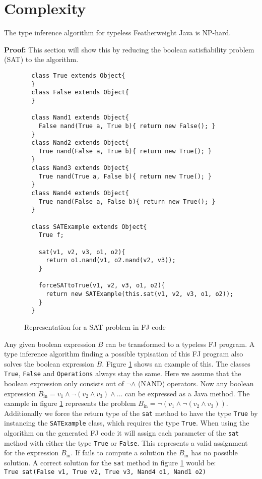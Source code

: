 \section{Complexity}
\label{sec:complexity}

\begin{theorem}[NP-Hardness]
  \label{theo:np-hardness}
  The type inference algorithm for typeless Featherweight Java is NP-hard.
\end{theorem}

\textbf{Proof:} This section will show this by reducing the boolean satisfiability problem (SAT) to the \fjtypeinference{} algorithm.

\begin{figure}
\begin{lstlisting}
  class True extends Object{
  }
  class False extends Object{
  }

  class Nand1 extends Object{
    False nand(True a, True b){ return new False(); }
  }
  class Nand2 extends Object{
    True nand(False a, True b){ return new True(); }
  }
  class Nand3 extends Object{
    True nand(True a, False b){ return new True(); }
  }
  class Nand4 extends Object{
    True nand(False a, False b){ return new True(); }
  }

  class SATExample extends Object{
    True f;

    sat(v1, v2, v3, o1, o2){
      return o1.nand(v1, o2.nand(v2, v3));
    }

    forceSATtoTrue(v1, v2, v3, o1, o2){
      return new SATExample(this.sat(v1, v2, v3, o1, o2));
    }
  }
\end{lstlisting}

\caption{Representation for a SAT problem in FJ code}
\label{fig:fjSATcode}
\end{figure}

Any given boolean expression $B$ can be transformed to a typeless FJ program.
A type inference algorithm finding a possible typisation of this FJ program also solves the boolean expression $B$.
Figure \ref{fig:fjSATcode} shows an example of this.
The classes \texttt{True}, \texttt{False} and \texttt{Operations} always stay the same.
Here we assume that the boolean expression only consists out of $\neg \land$ (NAND) operators.
Now any boolean expression $B_\text{in} = v_1 \land \neg (v_2 \land v_3) \land \ldots$ can be expressed as a Java method.
The example in figure \ref{fig:fjSATcode} represents the problem $B_\text{in} = \neg(v_1 \land \neg (v_2 \land v_3))$.
Additionally we force the return type of the \texttt{sat} method to have the type \texttt{True}
by instancing the \texttt{SATExample} class, which requires the type \texttt{True}.
When using the \fjtypeinference{} algorithm on the generated FJ code it will
assign each parameter of the \texttt{sat} method with either the type \texttt{True} or \texttt{False}.
This represents a valid assignment for the expression $B_\text{in}$.
If \fjtypeinference{} fails to compute a solution the $B_\text{in}$ has no possible solution.
A correct solution for the \texttt{sat} method in figure \ref{fig:fjSATcode} would be:\\
\texttt{True sat(False v1, True v2, True v3, Nand4 o1, Nand1 o2)}

